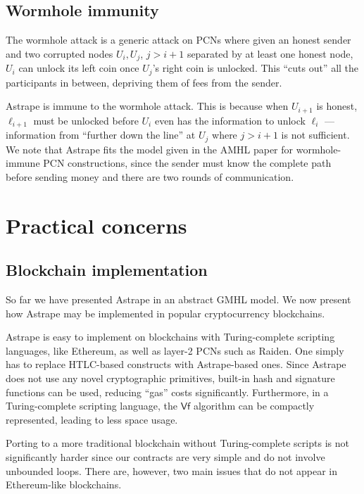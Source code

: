 \documentclass[USenglish,oneside,twocolumn]{article}
\begin{document}
\subsection{Wormhole immunity}

The wormhole attack \cite{malavolta2019anonymous} is a generic attack on PCNs where given an honest sender and two corrupted nodes $U_i,U_j$, $j>i+1$ separated by at least one honest node, $U_i$ can unlock its left coin once $U_j$'s right coin is unlocked. This ``cuts out'' all the participants in between, depriving them of fees from the sender.

Astrape is immune to the wormhole attack. This is because when $U_{i+1}$ is honest, $\ell_{i+1}$ must be unlocked before $U_i$ even has the information to unlock $\ell_{i}$ --- information from ``further down the line'' at $U_j$ where $j>{i+1}$ is not sufficient. We note that Astrape fits the model given in the AMHL paper \cite{malavolta2019anonymous} for wormhole-immune PCN constructions, since the sender must know the complete path before sending money and there are two rounds of communication.


\section{Practical concerns} \label{sec:practical}

\subsection{Blockchain implementation}

So far we have presented Astrape in an abstract GMHL model. We now present how Astrape may be implemented in popular cryptocurrency blockchains.

Astrape is easy to implement on blockchains with Turing-complete scripting languages, like Ethereum, as well as layer-2 PCNs such as Raiden. One simply has to replace HTLC-based constructs with Astrape-based ones. Since Astrape does not use any novel cryptographic primitives, built-in hash and signature functions can be used, reducing ``gas'' costs significantly. Furthermore, in a Turing-complete scripting language, the $\mathsf{Vf}$ algorithm can be compactly represented, leading to less space usage.

Porting to a more traditional blockchain without Turing-complete scripts is not significantly harder since our contracts are very simple and do not involve unbounded loops. There are, however, two main issues that do not appear in Ethereum-like blockchains.
\end{document}
